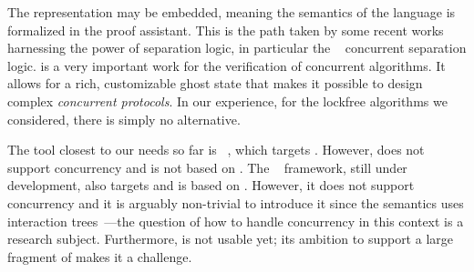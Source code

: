 The representation may be embedded, meaning the semantics of the language is formalized in the proof assistant.
This is the path taken by some recent works~\cite{DBLP:books/hal/Chargueraud23, DBLP:journals/pacmpl/GondelmanHPTB23, DBLP:conf/sosp/ChajedTKZ19} harnessing the power of separation logic, in particular the \Iris~\cite{DBLP:journals/jfp/JungKJBBD18} concurrent separation logic.
\Iris is a very important work for the verification of concurrent algorithms.
It allows for a rich, customizable ghost state that makes it possible to design complex \emph{concurrent protocols}.
In our experience, for the lockfree algorithms we considered, there is simply no alternative.

The tool closest to our needs so far is \CFML~\cite{DBLP:books/hal/Chargueraud23}, which targets \OCaml.
However, \CFML does not support concurrency and is not based on \Iris.
The \Osiris~\cite{osiris} framework, still under development, also targets \OCaml and is based on \Iris.
However, it does not support concurrency and it is arguably non-trivial to introduce it since the semantics uses interaction trees~\cite{DBLP:journals/pacmpl/XiaZHHMPZ20}---the question of how to handle concurrency in this context is a research subject.
Furthermore, \Osiris is not usable yet; its ambition to support a large fragment of \OCaml makes it a challenge.
